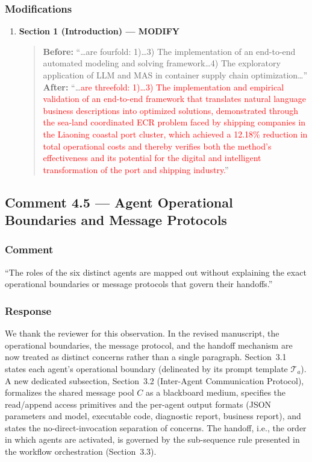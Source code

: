 \documentclass[11pt,a4paper]{article}
\begin{document}
\subsubsection{Modifications}
\begin{enumerate}
\item \textbf{Section 1 (Introduction) --- MODIFY}
\begin{quote}
\textbf{Before:} ``\ldots are fourfold: 1)\ldots 3) The implementation of an end-to-end automated modeling and solving framework\ldots 4) The exploratory application of LLM and MAS in container supply chain optimization\ldots''\\[4pt]
\textbf{After:} ``\ldots \textcolor{red}{are threefold: 1)\ldots 3) The implementation and empirical validation of an end-to-end framework that translates natural language business descriptions into optimized solutions, demonstrated through the sea-land coordinated ECR problem faced by shipping companies in the Liaoning coastal port cluster, which achieved a 12.18\% reduction in total operational costs and thereby verifies both the method's effectiveness and its potential for the digital and intelligent transformation of the port and shipping industry.}''
\end{quote}
\end{enumerate}

\subsection{Comment 4.5 --- Agent Operational Boundaries and Message Protocols}

\subsubsection{Comment}
``The roles of the six distinct agents are mapped out without explaining the exact operational boundaries or message protocols that govern their handoffs.''

\subsubsection{Response}
We thank the reviewer for this observation. In the revised manuscript, the operational boundaries, the message protocol, and the handoff mechanism are now treated as distinct concerns rather than a single paragraph. Section~3.1 states each agent's operational boundary (delineated by its prompt template $\mathcal{T}_a$). A new dedicated subsection, Section~3.2 (Inter-Agent Communication Protocol), formalizes the shared message pool $C$ as a blackboard medium, specifies the read/append access primitives and the per-agent output formats (JSON parameters and model, executable code, diagnostic report, business report), and states the no-direct-invocation separation of concerns. The handoff, i.e., the order in which agents are activated, is governed by the sub-sequence rule presented in the workflow orchestration (Section~3.3).
\end{document}
